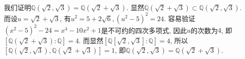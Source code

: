 \begin{eg}\label{sqrt(2)+sqrt(3)}
    我们证明$\mathbb{Q}(\sqrt{2},\sqrt{3})=\mathbb{Q}(\sqrt{2}+\sqrt{3})$.
    显然$\mathbb{Q}(\sqrt{2}+\sqrt{3})\subset\mathbb{Q}(\sqrt{2},\sqrt{3})$.
    而设$u=\sqrt{2}+\sqrt{3}$, 有$u^2=5+2\sqrt{6},(u^2-5)^2=24$.
    容易验证$(x^2-5)^2-24=x^4-10x^2+1$是不可约的四次多项式, 因此$u$的次数为$4$, 即$[\mathbb{Q}(\sqrt{2}+\sqrt{3}):\mathbb{Q}]=4$.
    而显然$[\mathbb{Q}[\sqrt{2},\sqrt{3}]:\mathbb{Q}]=4$, 所以$[\mathbb{Q}(\sqrt{2},\sqrt{3}),\mathbb{Q}(\sqrt{2}+\sqrt{3})]=1$, 即$\mathbb{Q}(\sqrt{2},\sqrt{3})=\mathbb{Q}(\sqrt{2}+\sqrt{3})$.
\end{eg}

